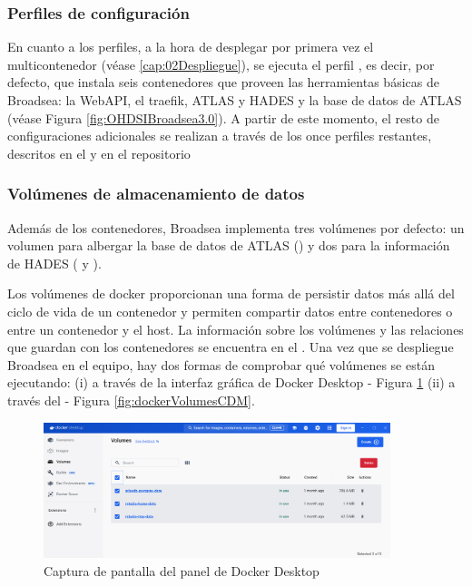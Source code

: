 \subsubsection{Perfiles de configuración}

En cuanto a los perfiles, a la hora de desplegar por primera vez el multicontenedor (véase \ref{cap:02Despliegue}), se ejecuta el perfil , es decir, por defecto, que instala seis contenedores que proveen las herramientas básicas de Broadsea:  la WebAPI, el traefik, ATLAS y HADES y la base de datos de ATLAS (véase Figura \ref{fig:OHDSIBroadsea3.0}). A partir de este momento, el resto de configuraciones adicionales se realizan a través de los once perfiles restantes, descritos en el  y en el repositorio \cite{githubBroadsea}

\subsubsection{Volúmenes de almacenamiento de datos}

Además de los contenedores, Broadsea implementa tres volúmenes por defecto: un volumen para albergar la base de datos de ATLAS () y dos para la información de HADES ( y ). 

Los volúmenes de docker proporcionan una forma de persistir datos más allá del ciclo de vida de un contenedor y permiten compartir datos entre contenedores o entre un contenedor y el host. La información sobre los volúmenes y las relaciones que guardan con los contenedores se encuentra en el . Una vez que se despliegue Broadsea en el equipo, hay dos formas de comprobar qué volúmenes se están ejecutando: (i) a través de la interfaz gráfica de Docker Desktop - Figura \ref{fig:dockerVolumes} (ii) a través del  - Figura \ref{fig:dockerVolumesCDM}.

\begin{figure}[H]
    \centering
    \includegraphics[width=0.90\textwidth]{figures/dockerVolumes.png}
     \caption{Captura de pantalla del panel  de Docker Desktop}
    \label{fig:dockerVolumes}
\end{figure}

